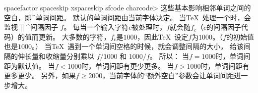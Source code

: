 \begindesc
\cts spacefactor {}
\cts spaceskip {}
\cts xspaceskip {}
\cts sfcode {\<charcode> }
\explain
这些基本影响相邻单词之间的空白，即^{单词间距}。
默认的单词间距由当前字体决定。
当\TeX\ 处理一个时，会监视 |\spacefactor| ^{间隔因子} $f$。
每当一个输入字符$c$被处理时，$f$就会随$f_c$（$c$的间隔因子代码）的值而更新。
大多数的字符，$f_c$是$1000$，因此\TeX\ 设定$f$为$1000$。（$f$的初始值也是$1000$。）
当\TeX\ 遇到一个单词间空格的时候，就会调整间隔的大小，
给该间隔的伸长量和收缩量分别乘以 $f/1000$ 和 $1000/f$。
所以：
\olist\compact
\li 当$f=1000$时，单词间距为默认值。
\li 当$f<1000$时，单词间距有更少更多。
\li 当$f>1000$时，单词间距有更多更少。
\endolist
另外，如果$f\ge2000$，当前字体的``额外空白''参数会让单词间距进一步增大。

